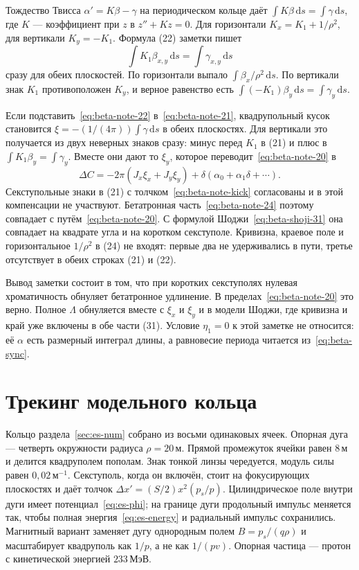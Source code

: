 \documentclass[aps,pra,preprint,a4paper,amsmath,amssymb,longbibliography]{revtex4-2}
\begin{document}
Тождество Твисса $\alpha'=K\beta-\gamma$ на периодическом кольце даёт $\int K\beta\,\mathrm{d}s=\int\gamma\,\mathrm{d}s$, где $K$ --- коэффициент при $z$ в $z''+Kz=0$. Для горизонтали $K_x=K_1+1/\rho^2$, для вертикали $K_y=-K_1$. Формула (22) заметки пишет
\begin{equation}
\label{eq:beta-note-22}
\int K_1\beta_{x,y}\,\mathrm{d}s=\int\gamma_{x,y}\,\mathrm{d}s
\end{equation}
сразу для обеих плоскостей. По горизонтали выпало $\int\beta_x/\rho^2\,\mathrm{d}s$. По вертикали знак $K_1$ противоположен $K_y$, и верное равенство есть $\int(-K_1)\beta_y\,\mathrm{d}s=\int\gamma_y\,\mathrm{d}s$.

Если подставить~\eqref{eq:beta-note-22} в~\eqref{eq:beta-note-21}, квадрупольный кусок становится $\xi=-(1/(4\pi))\int\gamma\,\mathrm{d}s$ в обеих плоскостях. Для вертикали это получается из двух неверных знаков сразу: минус перед $K_1$ в (21) и плюс в $\int K_1\beta_y=\int\gamma_y$. Вместе они дают то $\xi_y$, которое переводит~\eqref{eq:beta-note-20} в
\begin{equation}
\label{eq:beta-note-24}
\Delta C
=-2\pi(J_x\xi_x+J_y\xi_y)
+\delta(\alpha_0+\alpha_1\delta+\cdots).
\end{equation}
Секступольные знаки в (21) с толчком~\eqref{eq:beta-note-kick} согласованы и в этой компенсации не участвуют. Бетатронная часть~\eqref{eq:beta-note-24} поэтому совпадает с путём~\eqref{eq:beta-note-20}. С формулой Шоджи~\eqref{eq:beta-shoji-31} она совпадает на квадрате угла и на коротком секступоле. Кривизна, краевое поле и горизонтальное $1/\rho^2$ в (24) не входят: первые два не удерживались в пути, третье отсутствует в обеих строках (21) и (22).

Вывод заметки состоит в том, что при коротких секступолях нулевая хроматичность обнуляет бетатронное удлинение. В пределах~\eqref{eq:beta-note-20} это верно. Полное $\Lambda$ обнуляется вместе с $\xi_x$ и $\xi_y$ и в модели Шоджи, где кривизна и край уже включены в обе части (31). Условие $\eta_1=0$ к этой заметке не относится: её $\alpha$ есть размерный интеграл длины, а равновесие периода читается из~\eqref{eq:beta-sync}.
\section{Трекинг модельного кольца}
\label{app:ch3track}

Кольцо раздела~\ref{sec:es-num} собрано из восьми одинаковых ячеек. Опорная дуга --- четверть окружности радиуса $\rho=20\,\text{м}$. Прямой промежуток ячейки равен $8\,\text{м}$ и делится квадруполем пополам. Знак тонкой линзы чередуется, модуль силы равен $0{,}02\,\text{м}^{-1}$. Секступоль, когда он включён, стоит на фокусирующих плоскостях и даёт толчок $\Delta x'=(S/2)x^2(p_s/p)$. Цилиндрическое поле внутри дуги имеет потенциал~\eqref{eq:es-phi}; на границе дуги продольный импульс меняется так, чтобы полная энергия~\eqref{eq:es-energy} и радиальный импульс сохранились. Магнитный вариант заменяет дугу однородным полем $B=p_s/(q\rho)$ и масштабирует квадруполь как $1/p$, а не как $1/(pv)$. Опорная частица --- протон с кинетической энергией $233\,\text{МэВ}$.
\end{document}
